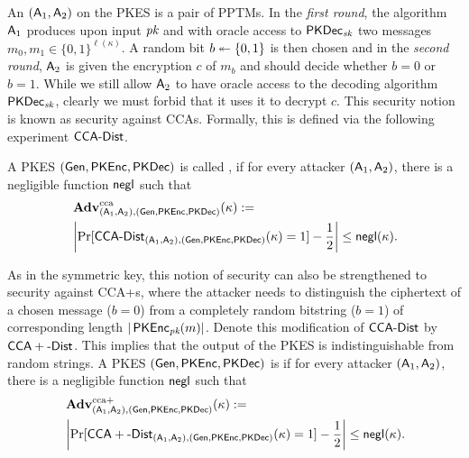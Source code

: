An 
$(\operatorname{\mathsf{A}}_{1},\operatorname{\mathsf{A}}_{2})$ on the \ac{PKES} is a pair of \acp{PPTM}. In the
\emph{first round}, the algorithm $\operatorname{\mathsf{A}}_{1}$ produces upon input $\textit{pk}$
and with oracle access to $\operatorname{\mathsf{PKDec}}_{\textit{sk}}$ two messages $m_{0},m_{1}\in
\{0,1\}^{\ell(\kappa)}$. A random bit $b\twoheadleftarrow \{0,1\}$ is then chosen
and in the \emph{second round}, $\operatorname{\mathsf{A}}_{2}$ is given
the encryption $c$ of $m_{b}$ and should decide whether $b=0$ or
$b=1$. While we still allow $\operatorname{\mathsf{A}}_{2}$ to have oracle access to the
decoding algorithm $\operatorname{\mathsf{PKDec}}_{\textit{sk}}$, clearly we must forbid that it
uses it to decrypt $c$. 
This security notion is known as security
against \acp{CCA}. Formally, this is defined via the following experiment
$\CCA-Dist$.



A \ac{PKES} $(\operatorname{\mathsf{Gen}},\operatorname{\mathsf{PKEnc}},\operatorname{\mathsf{PKDec}})$ is called , if for
every attacker $(\operatorname{\mathsf{A}}_{1},\operatorname{\mathsf{A}}_{2})$, there is a negligible function
$\operatorname{\mathsf{negl}}$ such that
\begin{align*}
  &\Adv_{(\Att_{1},\Att_{2}),(\Gen,\PKEnc,\PKDec)}^{\cca}(\kappa) :=\\
  &\left|\Pr[\CCA-Dist_{(\Att_{1},\Att_{2}),(\Gen,\PKEnc,\PKDec)}(\kappa)=1]
    - \frac{1}{2}\right|\leq \negl(\kappa).
\end{align*}

As in the symmetric key, this notion of security can also be
strengthened to security against \acfp{CCA+}, where the attacker needs
to distinguish the ciphertext of a chosen message ($b=0$) from a
completely random bitstring ($b=1$) of corresponding length
$|\operatorname{\mathsf{PKEnc}}_{\textit{pk}}(m)|$. Denote this modification of $\CCA-Dist$ by
$\CCAD-Dist$. This
implies that the output of the \ac{PKES} is indistinguishable from
random strings. A \ac{PKES} $(\operatorname{\mathsf{Gen}},\operatorname{\mathsf{PKEnc}},\operatorname{\mathsf{PKDec}})$ is
 if for every attacker $(\operatorname{\mathsf{A}}_{1},\operatorname{\mathsf{A}}_{2})$,
there is a negligible function $\operatorname{\mathsf{negl}}$ such that
\begin{align*}
  &\Adv_{(\Att_{1},\Att_{2}),(\Gen,\PKEnc,\PKDec)}^{\ccad}(\kappa) :=\\
  &\left|\Pr[\CCAD-Dist_{(\Att_{1},\Att_{2}),(\Gen,\PKEnc,\PKDec)}(\kappa)=1]-\frac{1}{2}\right|\leq
    \negl(\kappa).
\end{align*}





